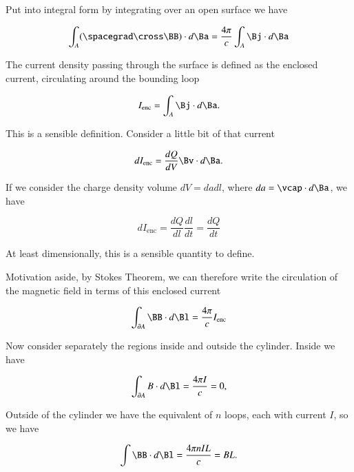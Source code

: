 Put into integral form by integrating over an open surface we have

\begin{equation}\label{eqn:relativisticElectrodynamicsT5:30}
\int_A (\spacegrad \cross \BB) \cdot d\Ba = \frac{4 \pi}{c} \int_A \Bj \cdot d\Ba
\end{equation}

The current density passing through the surface is defined as the enclosed current, circulating around the bounding loop

\begin{equation}\label{eqn:relativisticElectrodynamicsT5:50}
I_{\text{enc}} = \int_A \Bj \cdot d\Ba.
\end{equation}

This is a sensible definition.  Consider a little bit of that current

\begin{equation}\label{eqn:relativisticElectrodynamicsT5:51}
dI_{\text{enc}} = \frac{dQ}{dV} \Bv \cdot d\Ba.
\end{equation}

If we consider the charge density volume $dV = da dl$, where $da = \vcap \cdot d\Ba$, we have

\begin{equation}\label{eqn:relativisticElectrodynamicsT5:52}
dI_{\text{enc}} = \frac{dQ}{dl} \frac{dl}{dt} = \frac{dQ}{dt}
\end{equation}

At least dimensionally, this is a sensible quantity to define.

Motivation aside, by Stokes Theorem, we can therefore write the circulation of the magnetic field in terms of this enclosed current

\begin{equation}\label{eqn:relativisticElectrodynamicsT5:70}
\int_{\partial A} \BB \cdot d\Bl = \frac{4 \pi}{c} I_{\text{enc}}
\end{equation}

Now consider separately the regions inside and outside the cylinder.  Inside we have

\begin{equation}\label{eqn:relativisticElectrodynamicsT5:71}
\int_{\partial A} B \cdot d \Bl = \frac{4 \pi I }{c} = 0,
\end{equation}

Outside of the cylinder we have the equivalent of $n$ loops, each with current $I$, so we have

\begin{equation}\label{eqn:relativisticElectrodynamicsT5:90}
\int \BB \cdot d\Bl = \frac{4 \pi n I L}{c} = B L.
\end{equation}

